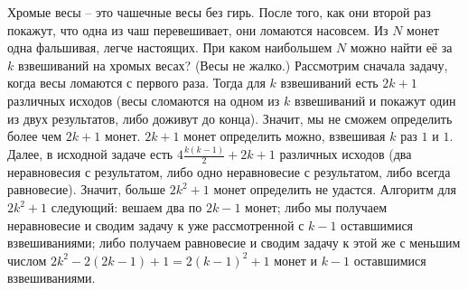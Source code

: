 \problem
Хромые весы – это чашечные весы без гирь.
После того, как они второй раз покажут, что одна из чаш перевешивает, они
ломаются насовсем.
Из $N$ монет одна фальшивая, легче настоящих.
При каком наибольшем $N$ можно найти её за $k$ взвешиваний на хромых весах?
(Весы не жалко.)
\solution
Рассмотрим сначала задачу, когда весы ломаются с первого раза.
Тогда для $k$ взвешиваний есть $2 k + 1$ различных исходов
(весы сломаются на одном из $k$ взвешиваний и покажут один из двух результатов,
либо доживут до конца).
Значит, мы не сможем определить более чем $2 k + 1$ монет.
$2 k + 1$ монет определить можно, взвешивая $k$ раз $1$ и $1$.
\\
Далее, в исходной задаче есть $4 \frac{k (k - 1)}{2} + 2 k + 1$ различных
исходов (два неравновесия с результатом, либо одно неравновесие с
результатом, либо всегда равновесие).
Значит, больше $2 k^2 + 1$ монет определить не удастся.
Алгоритм для $2 k^2 + 1$ следующий: вешаем два по $2 k - 1$ монет;
либо мы получаем неравновесие и сводим задачу к уже рассмотренной с $k - 1$
оставшимися взвешиваниями;
либо получаем равновесие и сводим задачу к этой же с меньшим числом
$2 k^2 - 2 (2 k - 1) + 1 = 2 (k - 1)^2 + 1$ монет и $k - 1$ оставшимися
взвешиваниями.
\endproblem
